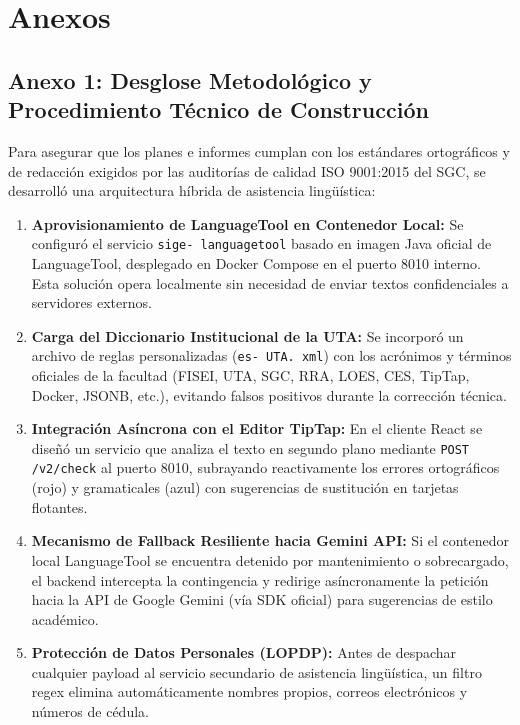 \documentclass[12pt,a4paper]{article}
\begin{document}
\vspace{0.4cm}

\section{Anexos}

\subsection*{Anexo 1: Desglose Metodológico y Procedimiento Técnico de Construcción}
Para asegurar que los planes e informes cumplan con los estándares ortográficos y de redacción exigidos por las auditorías de calidad ISO 9001:2015 del SGC, se desarrolló una arquitectura híbrida de asistencia lingüística:

\begin{enumerate}[leftmargin=1.5em, itemsep=3pt]
    \item \textbf{Aprovisionamiento de LanguageTool en Contenedor Local:} Se configuró el servicio \texttt{sige- languagetool} basado en imagen Java oficial de LanguageTool, desplegado en Docker Compose en el puerto 8010 interno. Esta solución opera localmente sin necesidad de enviar textos confidenciales a servidores externos.
    \item \textbf{Carga del Diccionario Institucional de la UTA:} Se incorporó un archivo de reglas personalizadas (\texttt{es- UTA. xml}) con los acrónimos y términos oficiales de la facultad (FISEI, UTA, SGC, RRA, LOES, CES, TipTap, Docker, JSONB, etc.), evitando falsos positivos durante la corrección técnica.
    \item \textbf{Integración Asíncrona con el Editor TipTap:} En el cliente React se diseñó un servicio que analiza el texto en segundo plano mediante \texttt{POST /\allowbreak  v2/\allowbreak  check} al puerto 8010, subrayando reactivamente los errores ortográficos (rojo) y gramaticales (azul) con sugerencias de sustitución en tarjetas flotantes.
    \item \textbf{Mecanismo de Fallback Resiliente hacia Gemini API:} Si el contenedor local LanguageTool se encuentra detenido por mantenimiento o sobrecargado, el backend intercepta la contingencia y redirige asíncronamente la petición hacia la API de Google Gemini (vía SDK oficial) para sugerencias de estilo académico.
    \item \textbf{Protección de Datos Personales (LOPDP):} Antes de despachar cualquier payload al servicio secundario de asistencia lingüística, un filtro regex elimina automáticamente nombres propios, correos electrónicos y números de cédula.
\end{enumerate}
\end{document}
